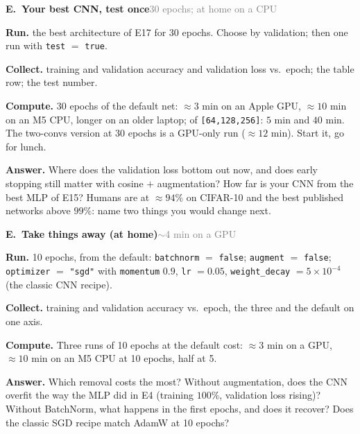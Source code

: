 \documentclass[11pt]{article}
\newcommand{\code}[1]{\texttt{#1}}
\newcounter{exp}
\newenvironment{experiment}[2]{\refstepcounter{exp}\par\medskip
  \textbf{\textcolor{aiblue}{E\theexp.\ #1}}\hfill{\small\textcolor{gray}{#2}}\par}{\par}
\newcommand{\run}[1]{\textbf{Run.} #1\par}
\newcommand{\collect}[1]{\textbf{Collect.} #1\par}
\newcommand{\answer}[1]{\textbf{Answer.} #1\par}
\newcommand{\heavy}[1]{\textcolor{gray!70!black}{\textbf{Compute.} #1}\par}
\begin{document}
\begin{experiment}{Your best CNN, test once}{30 epochs; at home on a CPU}
\run{the best architecture of E17 for 30 epochs. Choose by validation; then one run with \code{test} $=$ \code{true}.}
\collect{training and validation accuracy and validation loss vs.\ epoch; the table row; the test number.}
\heavy{30 epochs of the default net: $\approx3$ min on an Apple GPU, $\approx10$ min on an M5 CPU, longer on an older laptop; of \code{[64,128,256]}: $5$ min and $40$ min. The two-convs version at 30 epochs is a GPU-only run ($\approx12$ min). Start it, go for lunch.}
\answer{Where does the validation loss bottom out now, and does early stopping still matter with cosine $+$ augmentation? How far is your CNN from the best MLP of E15? Humans are at $\approx94\%$ on CIFAR-10 and the best published networks above $99\%$: name two things you would change next.}
\end{experiment}

\begin{experiment}{Take things away (at home)}{$\sim$4 min on a GPU}
\run{10 epochs, from the default: \code{batchnorm} $=$ \code{false}; \code{augment} $=$ \code{false}; \code{optimizer} $=$ \code{"sgd"} with \code{momentum} $0.9$, \code{lr} $=0.05$, \code{weight\_decay} $=5\times10^{-4}$ (the classic CNN recipe).}
\collect{training and validation accuracy vs.\ epoch, the three and the default on one axis.}
\heavy{Three runs of 10 epochs at the default cost: $\approx3$ min on a GPU, $\approx10$ min on an M5 CPU at 10 epochs, half at 5.}
\answer{Which removal costs the most? Without augmentation, does the CNN overfit the way the MLP did in E4 (training $100\%$, validation loss rising)? Without BatchNorm, what happens in the first epochs, and does it recover? Does the classic SGD recipe match AdamW at 10 epochs?}
\end{experiment}
\end{document}
